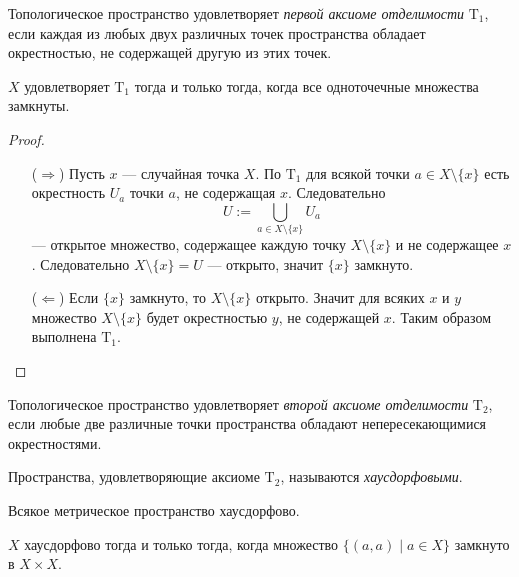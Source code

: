 \documentclass[12pt,a4paper]{article}
\newcommand{\T}{\ensuremath{\mathrm{T}}\xspace}
\begin{document}
    \begin{definition}
        Топологическое пространство удовлетворяет \emph{первой аксиоме отделимости} $\T_1$, если каждая из любых двух различных точек пространства обладает окрестностью, не содержащей другую из этих точек.
    \end{definition}

    \begin{theorem}
        $X$ удовлетворяет $\T_1$ тогда и только тогда, когда все одноточечные множества замкнуты.
    \end{theorem}

    \begin{proof}
        \begin{itemize}
            \item[($\Rightarrow$)] Пусть $x$ --- случайная точка $X$. По $\T_1$ для всякой точки $a \in X \setminus \{x\}$ есть окрестность $U_a$ точки $a$, не содержащая $x$. Следовательно
                \[U := \bigcup_{a \in X \setminus \{x\}} U_a\]
                --- открытое множество, содержащее каждую точку $X \setminus \{x\}$ и не содержащее $x$. Следовательно $X \setminus \{x\} = U$ --- открыто, значит $\{x\}$ замкнуто.

            \item[($\Leftarrow$)] Если $\{x\}$ замкнуто, то $X \setminus \{x\}$ открыто. Значит для всяких $x$ и $y$ множество $X \setminus \{x\}$ будет окрестностью $y$, не содержащей $x$. Таким образом выполнена $\T_1$.
        \end{itemize}
    \end{proof}

    \begin{definition}
        Топологическое пространство удовлетворяет \emph{второй аксиоме отделимости} $\T_2$, если любые две различные точки пространства обладают непересекающимися окрестностями.

        Пространства, удовлетворяющие аксиоме $\T_2$, называются \emph{хаусдорфовыми}.
    \end{definition}

    \begin{remark*}
        Всякое метрическое пространство хаусдорфово.
    \end{remark*}

    \begin{theorem}
        $X$ хаусдорфово тогда и только тогда, когда множество $\{(a, a) \mid a \in X\}$ замкнуто в $X \times X$.
    \end{theorem}
\end{document}
